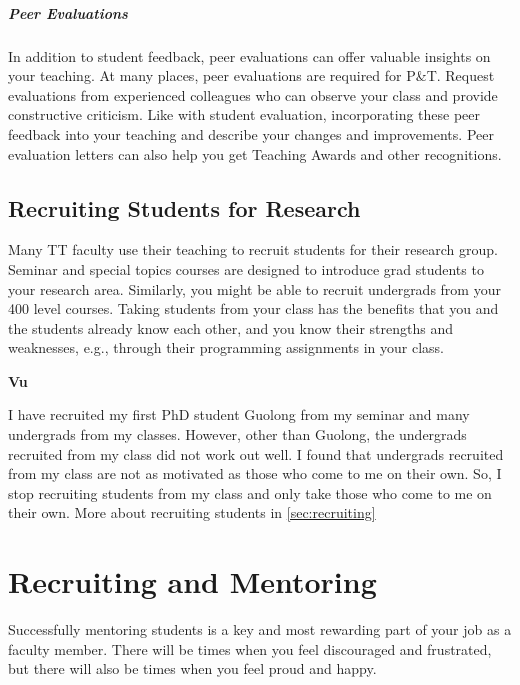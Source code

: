 \documentclass[oneside,11pt,dvipsnames]{book}
\newenvironment{commentbox}[1][]{
  \small
  \begin{mybox}
    {\small \textbf{#1}}
  }{
  \end{mybox}
}
\begin{document}
\paragraph{Peer Evaluations}

In addition to student feedback, peer evaluations can offer valuable insights on your teaching. At many places, peer evaluations are required for P\&T.
Request evaluations from experienced colleagues who can observe your class and provide constructive criticism. Like with student evaluation, incorporating these peer feedback into your teaching and describe your changes and improvements.  Peer evaluation letters can also help you get Teaching Awards and other recognitions.



\section{Recruiting Students for Research} Many TT faculty use their teaching to recruit students for their research group.  Seminar and special topics courses are designed to introduce grad students to your research area. Similarly, you might be able to recruit undergrads from your 400 level courses.  Taking students from your class has the benefits that you and the students already know each other, and you know their strengths and weaknesses, e.g., through their programming assignments in your class.  


\begin{commentbox}[Vu]
  I have recruited my first PhD student Guolong from my seminar and many undergrads from my classes. However, other than Guolong, the undergrads recruited from my class did not work out well.  I found that undergrads recruited from my class are not as motivated as those who come to me on their own. So, I stop recruiting students from my class and only take those who come to me on their own. More about recruiting students in \autoref{sec:recruiting}
\end{commentbox}

\chapter{Recruiting and Mentoring}

Successfully mentoring students is a key and most rewarding part of your job as a faculty member. 
There will be times when you feel discouraged and frustrated, but there will also be times when you feel proud and happy.  
\end{document}
